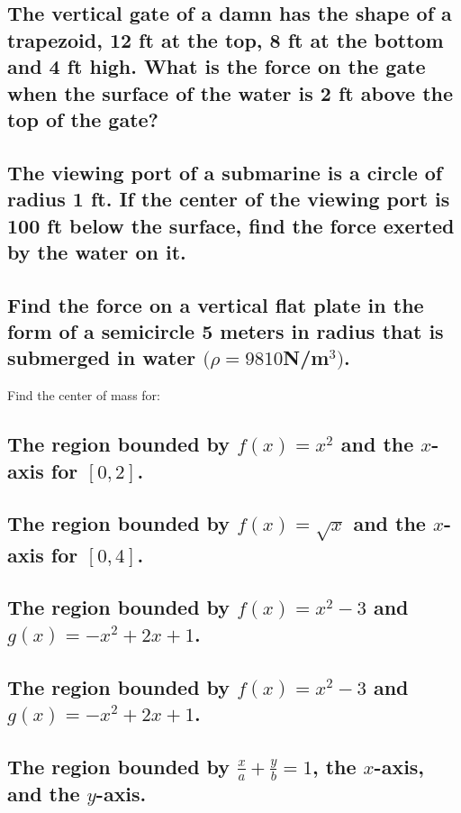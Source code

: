 \documentclass{article}
\begin{document}
\subsection{The vertical gate of a damn has the shape of a trapezoid, 12 ft at the top, 8 ft at the bottom and 4 ft high. What is the force on the gate when the surface of the water is 2 ft above the top of the gate?}

\subsection{The viewing port of a submarine is a circle of radius 1 ft. If the center of the viewing port is 100 ft below the surface, find the force exerted by the water on it.}

\subsection{Find the force on a vertical flat plate in the form of a semicircle 5 meters in radius that is submerged in water $(\rho = 9810 $N/m$^3)$.}

Find the center of mass for:
\subsection{The region bounded by $f(x) = x^2$ and the $x$-axis for $[0, 2]$.}

\subsection{The region bounded by $f(x) = \sqrt{x}$ and the $x$-axis for $[0, 4]$.}

\subsection{The region bounded by $f(x) = x^2 - 3$ and $g(x) = -x^2 + 2x + 1$.}

\subsection{The region bounded by $f(x) = x^2 - 3$ and $g(x) = -x^2 + 2x + 1$.}

\subsection{The region bounded by $\frac{x}{a} +\frac{y}{b} = 1$, the $x$-axis, and the $y$-axis.}
\end{document}
